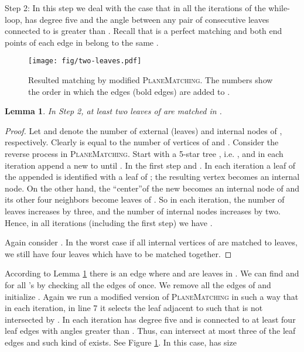 \documentclass[11pt,a4paper]{article}
\newtheorem{lemma}{Lemma}
\begin{document}
\begin{paragraph}{Step 2:}
In this step we deal with the case that in all the iterations of the while-loop,  has degree five and the angle between any pair of consecutive leaves connected to  is greater than . Recall that  is a perfect matching and both end points of each
edge in  belong to the same .

\begin{figure}[ht]
  \centering
    \texttt{[image: fig/two-leaves.pdf]}
  \caption{Resulted matching  by modified {\scshape PlaneMatching}. The numbers show the order in which the edges (bold edges) are added to .}
\label{two-leaves-fig}
\end{figure}

\begin{lemma}
\label{two-leaves-lemma}
In Step 2, at least two leaves of  are matched in .
\end{lemma}
\begin{proof}
 Let  and  denote the number of external (leaves) and internal nodes of , respectively. Clearly  is equal to the number of vertices of  and . Consider the reverse process in {\scshape PlaneMatching}. Start with a 5-star tree , i.e. , and in each iteration append a new  to  until . In the first step  and . In each iteration a leaf of the appended  is identified with a leaf of ; the resulting vertex becomes an internal node. On the other hand, the \textquotedblleft center\textquotedblright of the new  becomes an internal node of  and its other four neighbors become leaves of . So in each iteration, the number of leaves  increases by three, and the number of internal nodes  increases by two. Hence, in all iterations (including the first step) we have .

Again consider . In the worst case if all  internal vertices of  are matched to leaves, we still have four leaves which have to be matched together.   
\end{proof}

According to Lemma \ref{two-leaves-lemma} there is an edge  where  and  are leaves in . We can find  and  for all 's by checking all the edges of  once. We remove all the edges of  and initialize . Again we run a modified version of {\scshape PlaneMatching} in such a way that in each iteration, in line 7 it selects the leaf  adjacent to  such that  is not intersected by . In each iteration  has degree five and is connected to at least four leaf edges with angles greater than . Thus,  can intersect at most three of the leaf edges and such kind of  exists. See Figure \ref{two-leaves-fig}. In this case,  has size


\end{paragraph}
\end{document}
